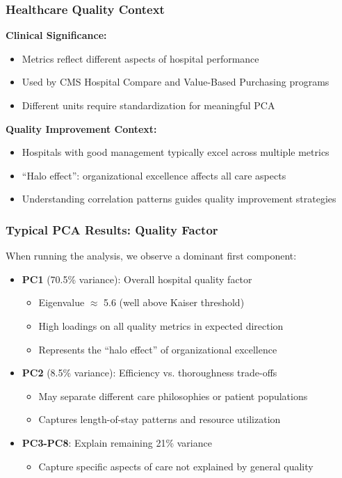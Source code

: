\documentclass[aspectratio=169]{beamer}
\begin{document}
\begin{frame}
    \frametitle{Healthcare Quality Context}
    \textbf{Clinical Significance:}
    \begin{itemize}
        \item Metrics reflect different aspects of hospital performance \pause
        \item Used by CMS Hospital Compare and Value-Based Purchasing programs \pause
        \item Different units require standardization for meaningful PCA \pause
    \end{itemize}
    \vspace{12pt}
    \textbf{Quality Improvement Context:}
    \begin{itemize}
        \item Hospitals with good management typically excel across multiple metrics \pause
        \item ``Halo effect'': organizational excellence affects all care aspects \pause
        \item Understanding correlation patterns guides quality improvement strategies \pause
    \end{itemize}
\end{frame}

\begin{frame}
    \frametitle{Typical PCA Results: Quality Factor}
    When running the analysis, we observe a dominant first component:
    \begin{itemize}
        \item \textbf{PC1} (70.5\% variance): Overall hospital quality factor \pause
              \begin{itemize}
                  \item Eigenvalue $\approx$ 5.6 (well above Kaiser threshold) \pause
                  \item High loadings on all quality metrics in expected direction \pause
                  \item Represents the ``halo effect'' of organizational excellence \pause
              \end{itemize}
        \item \textbf{PC2} (8.5\% variance): Efficiency vs. thoroughness trade-offs \pause
              \begin{itemize}
                  \item May separate different care philosophies or patient populations \pause
                  \item Captures length-of-stay patterns and resource utilization \pause
              \end{itemize}
        \item \textbf{PC3-PC8}: Explain remaining 21\% variance \pause
              \begin{itemize}
                  \item Capture specific aspects of care not explained by general quality \pause
              \end{itemize}
    \end{itemize}
\end{frame}
\end{document}
